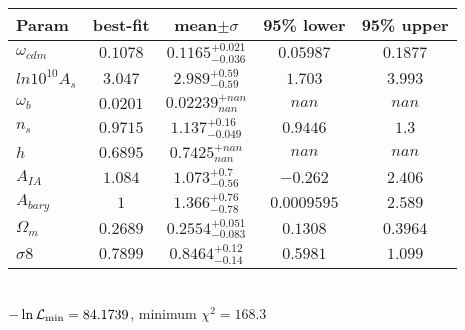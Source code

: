 \begin{tabular}{|l|c|c|c|c|} 
 \hline 
Param & best-fit & mean$\pm\sigma$ & 95\% lower & 95\% upper \\ \hline 
$\omega_{cdm }$ &$0.1078$ & $0.1165_{-0.036}^{+0.021}$ & $0.05987$ & $0.1877$ \\ 
$ln10^{10}A_{s }$ &$3.047$ & $2.989_{-0.59}^{+0.59}$ & $1.703$ & $3.993$ \\ 
$\omega_{b }$ &$0.0201$ & $0.02239_{nan}^{+nan}$ & $nan$ & $nan$ \\ 
$n_{s }$ &$0.9715$ & $1.137_{-0.049}^{+0.16}$ & $0.9446$ & $1.3$ \\ 
$h$ &$0.6895$ & $0.7425_{nan}^{+nan}$ & $nan$ & $nan$ \\ 
$A_{IA }$ &$1.084$ & $1.073_{-0.56}^{+0.7}$ & $-0.262$ & $2.406$ \\ 
$A_{bary }$ &$1$ & $1.366_{-0.78}^{+0.76}$ & $0.0009595$ & $2.589$ \\ 
$\Omega_{m }$ &$0.2689$ & $0.2554_{-0.083}^{+0.051}$ & $0.1308$ & $0.3964$ \\ 
$\sigma8$ &$0.7899$ & $0.8464_{-0.14}^{+0.12}$ & $0.5981$ & $1.099$ \\ 
\hline 
 \end{tabular} \\ 
$-\ln{\cal L}_\mathrm{min} =84.1739$, minimum $\chi^2=168.3$ \\ 
